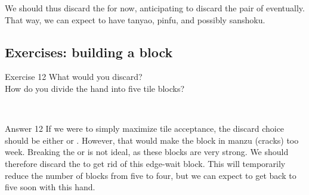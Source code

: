 \emj
We should thus discard the {\LARGE{}} for now, anticipating to discard the pair of {\LARGE{}} eventually. That way, we can expect to have {\jap tanyao}, {\jap pinfu}, and possibly {\jap sanshoku}.

\vfill

\subsection*{Exercises: building a block}

\bigskip

\bigskip

\begin{itembox}[l]{Exercise 12}
What would you discard? \\
\vsp
How do you divide the hand into five tile blocks?

\vspace{-30pt}
\bp
{}\\ \vspace{-16pt}
\rfw{}
\ep
\end{itembox}

\newpage

\begin{itembox}[r]{Answer 12}
\emj
If we were to simply maximize tile acceptance, the discard choice should be either {\LARGE{}} or {\LARGE\rfw}. However, that would make the block in {\jap manzu} (cracks) too week. Breaking the {\LARGE{}} or {\LARGE{}} is not ideal, as these blocks are very strong. We should therefore discard the {\LARGE{}} to get rid of this edge-wait block. This will temporarily reduce the number of blocks from five to four, but we can expect to get back to five soon with this hand.
\end{itembox}

\vfill

